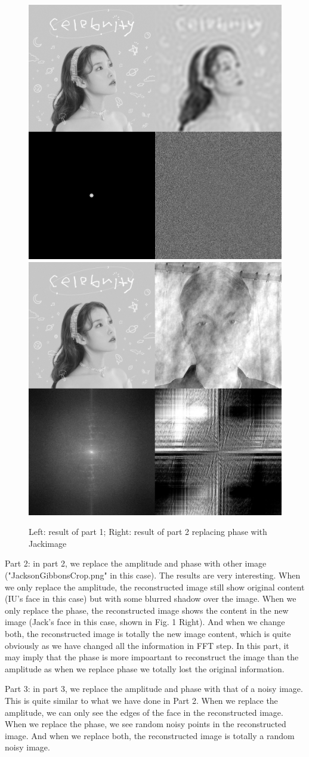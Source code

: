 \begin{figure}[htbp]
    \centering
    \includegraphics[width=0.49\linewidth]{Part1_small_radius.png}
    \includegraphics[width=0.49\linewidth]{Part2_phase.png}
    \caption{Left: result of part 1; Right: result of part 2 replacing phase with Jackimage}
\end{figure}



Part 2: in part 2, we replace the amplitude and phase with other image ("JacksonGibbonsCrop.png" in this case). The results are very interesting. When we only replace the amplitude, the reconstructed image still show original content (IU's face in this case) but with some blurred shadow over the image. When we only replace the phase, the reconstructed image shows the content in the new image (Jack's face in this case, shown in Fig. 1 Right). And when we change both, the reconstructed image is totally the new image content, which is quite obviously as we have changed all the information in FFT step.
In this part, it may imply that the phase is more impoartant to reconstruct the image than the amplitude as when we replace phase we totally lost the original information.

\pagebreak
Part 3: in part 3, we replace the amplitude and phase with that of a noisy image. This is quite similar to what we have done in Part 2. When we replace the amplitude, we can only see the edges of the face in the reconstructed image. When we replace the phase, we see random noisy points in the reconstructed image. And when we replace both, the reconstructed image is totally a random noisy image.


